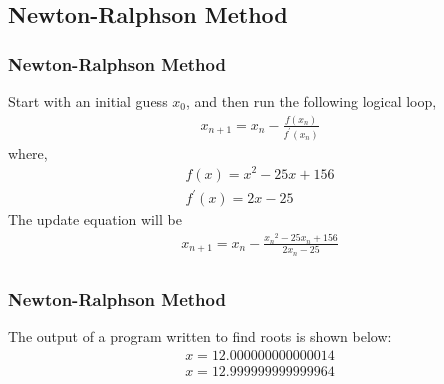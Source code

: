 \documentclass{beamer}
\providecommand{\brak}[1]{\ensuremath{\left(#1\right)}}
\theoremstyle{remark}
\numberwithin{equation}{section}
\begin{document}
    \subsection{Newton-Ralphson Method}
    \begin{frame}
      \frametitle{Newton-Ralphson Method}
      Start with an initial guess $x_0$, and then run the following logical loop,
      \begin{align}
        x_{n+1} = x_n - \frac{f\brak{x_n}}{f^{\prime}\brak{x_n}} 
      \end{align}
      where,
      \begin{align}
        f\brak{x} = x^2 - 25x + 156\\
        f^{\prime}\brak{x} = 2x - 25
      \end{align}
      The update equation will be
      \begin{align}
        x_{n+1} = x_n - \frac{{x_n}^2 - 25x_n + 156}{2x_n - 25}\\
      \end{align}
    \end{frame}
    \begin{frame}
      \frametitle{Newton-Ralphson Method}
      The output of a program written to find roots is shown below:
      \begin{align}
        x = 12.000000000000014 \\
        x = 12.999999999999964
      \end{align}    
    \end{frame}
\end{document}
